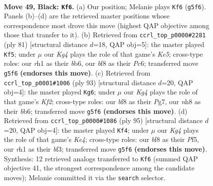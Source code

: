 \documentclass[11pt]{article}
\begin{document}
\clearpage

\begin{figure}[p]\centering
\begin{subfigure}{0.46\textwidth}\centering
\resizebox{\linewidth}{!}{%
\newchessgame
\chessboard[
  setfen={5B1N/p7/P7/1P3pk1/5b2/3K4/8/7R b - - 5 49},
  showmover=false,
  pgfstyle=straightmove, color=movearrow, markmove={g5-f6}
]}
\caption{}
\end{subfigure}\hfill
\begin{subfigure}{0.46\textwidth}\centering
\resizebox{\linewidth}{!}{%
\newchessgame
\chessboard[
  setfen={8/8/1Bp5/3b2p1/p3k3/P7/1P2K1P1/8 b - - 3 41},
  showmover=false,
  pgfstyle=straightmove, color=movearrow, markmove={e4-f5}
]}
\caption{}
\end{subfigure}
\\[4pt]
\begin{subfigure}{0.46\textwidth}\centering
\resizebox{\linewidth}{!}{%
\newchessgame
\chessboard[
  setfen={4b3/5kp1/1B6/5p2/5P1K/1P5P/8/8 b - - 2 47},
  showmover=false,
  pgfstyle=straightmove, color=movearrow, markmove={f7-g6}
]}
\caption{}
\end{subfigure}\hfill
\begin{subfigure}{0.46\textwidth}\centering
\resizebox{\linewidth}{!}{%
\newchessgame
\chessboard[
  setfen={8/5p2/3b4/4kp2/7p/2K2B1P/6P1/8 b - - 0 48},
  showmover=false,
  pgfstyle=straightmove, color=movearrow, markmove={e5-f4}
]}
\caption{}
\end{subfigure}
\caption{\textbf{Move 49, Black: \texttt{Kf6}.} (a) Our position; Melanie plays \texttt{Kf6} (\texttt{g5f6}). Panels (b)--(d) are the retrieved master positions whose correspondence most drove this move (highest QAP objective among those that transfer to it). (b) Retrieved from \texttt{ccrl\_top\_p0000\#2281} (ply 81) [structural distance $d$=18, QAP obj=5]: the master played \texttt{Kf5}; under $\mu$ our \emph{Kg4} plays the role of that game's \emph{Ke5}; cross-type roles: our \emph{r}h1 as their \emph{b}b6, our \emph{b}f8 as their \emph{P}c6; transferred move \texttt{g5f6} \textbf{(endorses this move)}. (c) Retrieved from \texttt{ccrl\_top\_p0001\#1006} (ply 93) [structural distance $d$=20, QAP obj=4]: the master played \texttt{Kg6}; under $\mu$ our \emph{Kg4} plays the role of that game's \emph{Kf2}; cross-type roles: our \emph{b}f8 as their \emph{P}g7, our \emph{n}h8 as their \emph{b}b6; transferred move \texttt{g5f6} \textbf{(endorses this move)}. (d) Retrieved from \texttt{ccrl\_top\_p0000\#1086} (ply 95) [structural distance $d$=20, QAP obj=4]: the master played \texttt{Kf4}; under $\mu$ our \emph{Kg4} plays the role of that game's \emph{Ke4}; cross-type roles: our \emph{b}f8 as their \emph{P}f5, our \emph{r}h1 as their \emph{b}f3; transferred move \texttt{g5f6} \textbf{(endorses this move)}. Synthesis: 12 retrieved analogs transferred to \texttt{Kf6} (summed QAP objective 41, the strongest correspondence among the candidate moves); Melanie committed it via the \texttt{search} selector.}
\label{fig:thought-m97}
\end{figure}
\end{document}
